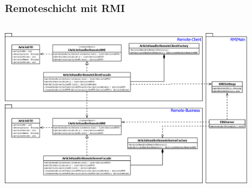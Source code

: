 
\begin{frame}
  \frametitle{Remoteschicht mit RMI}
	    \begin{column}{1\linewidth}
	    	\begin{center}
	    		\includegraphics[width=0.8\textwidth]{images/classdia_rmi.png}
	    	\end{center}
	    \end{column}
\end{frame}
